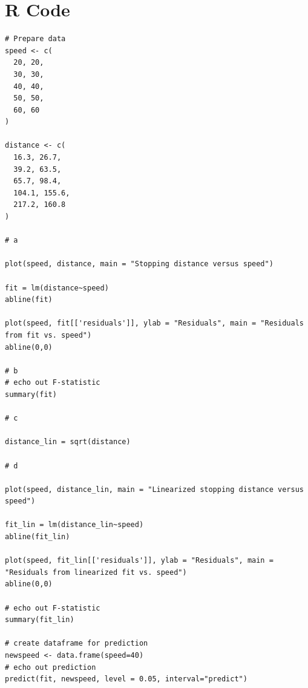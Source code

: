 \documentclass{article}
\begin{document}
\section*{R Code}
\begin{verbatim}
# Prepare data
speed <- c(
  20, 20, 
  30, 30, 
  40, 40, 
  50, 50, 
  60, 60
)

distance <- c(
  16.3, 26.7,
  39.2, 63.5,
  65.7, 98.4,
  104.1, 155.6,
  217.2, 160.8
)

# a

plot(speed, distance, main = "Stopping distance versus speed")

fit = lm(distance~speed)
abline(fit)

plot(speed, fit[['residuals']], ylab = "Residuals", main = "Residuals from fit vs. speed")
abline(0,0)

# b
# echo out F-statistic
summary(fit)

# c

distance_lin = sqrt(distance)

# d

plot(speed, distance_lin, main = "Linearized stopping distance versus speed")

fit_lin = lm(distance_lin~speed)
abline(fit_lin)

plot(speed, fit_lin[['residuals']], ylab = "Residuals", main = "Residuals from linearized fit vs. speed")
abline(0,0)

# echo out F-statistic
summary(fit_lin)

# create dataframe for prediction
newspeed <- data.frame(speed=40)
# echo out prediction
predict(fit, newspeed, level = 0.05, interval="predict")

\end{verbatim}
\end{document}
